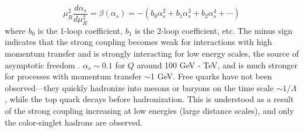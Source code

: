 \begin{equation}
    \mu^2_R\frac{d\alpha_s}{d\mu_R^2} = \beta(\alpha_s) = -(b_0 \alpha_s^2 + b_1 \alpha_s^3 + b_2 \alpha_s^4 + \cdots)
    \label{eq:renormalization_group}
\end{equation}
where $b_0$ is the 1-loop coefficient, $b_1$ is the 2-loop coefficient, etc. The minus sign indicates that the strong coupling becomes weak for interactions with high momentum transfer and is strongly interacting for low energy scales, the source of asymptotic freedom \cite{PhysRevLett.30.1346, PhysRevLett.30.1343}. $\alpha_s \sim 0.1$ for $Q$ around 100 GeV - TeV,  and is much stronger for processes with momentum transfer $\sim$1 GeV. Free quarks have not been observed---they quickly hadronize into mesons or baryons on the time scale $\sim 1/\Lambda$, while the top quark decays before hadronization. This is understood as a result of the strong coupling increasing at low energies (large distance scales), and only the color-singlet hadrons are observed.
